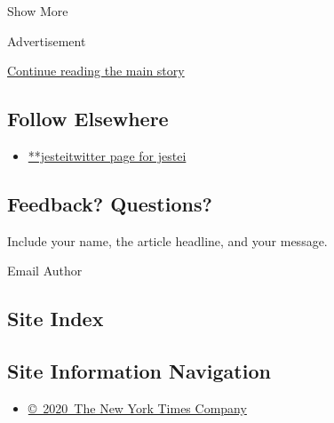 Show More

Advertisement

\protect\hyperlink{after-mid2}{Continue reading the main story}

\hypertarget{follow-elsewhere}{%
\subsection{Follow Elsewhere}\label{follow-elsewhere}}

\begin{itemize}
\tightlist
\item
  \href{https://twitter.com/jestei}{**jesteitwitter page for jestei}
\end{itemize}

\hypertarget{feedback-questions}{%
\subsection{Feedback? Questions?}\label{feedback-questions}}

Include your name, the article headline, and your message.

Email Author

\hypertarget{site-index}{%
\subsection{Site Index}\label{site-index}}

\hypertarget{site-information-navigation}{%
\subsection{Site Information
Navigation}\label{site-information-navigation}}

\begin{itemize}
\tightlist
\item
  \href{https://help.nytimes.com/hc/en-us/articles/115014792127-Copyright-notice}{©~2020~The
  New York Times Company}
\end{itemize}

